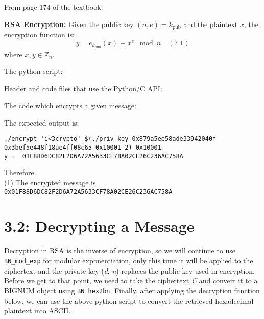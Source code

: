 \documentclass[a4paper,11pt]{article}
\theoremstyle{mytheor}
\begin{document}
\noindent From page 174 of the textbook:
\begin{tcolorbox}[colback=white,colframe=black,sharp corners, boxrule=0.5pt]
\textbf{RSA Encryption:} Given the public key \((n,e) = k_{\text{pub}}\) and the plaintext \(x\), the encryption function is:
\[ y = e_{k_{\text{pub}}}(x) \equiv x^e \mod n \quad (7.1) \]
where \(x, y \in \mathbb{Z}_n\).
\end{tcolorbox}
\vspace{4mm} %
\noindent The python script:


\vspace{4mm} %
\noindent Header and code files that use the Python/C API:

\vspace{4mm} %


\vspace{4mm}
\noindent The code which encrypts a given message:
\vspace{4mm} %


\vspace{4mm}
\noindent The expected output is:

\begin{verbatim}
./encrypt 'i<3crypto' $(./priv_key 0x879a5ee58ade33942040f  
0x3bef5e448f18ae4ff08c65 0x10001 2) 0x10001
y =  01F88D6DC82F2D6A72A5633CF78A02CE26C236AC758A
\end{verbatim}

\noindent Therefore \\
(1) The encrypted message is \texttt{0x01F88D6DC82F2D6A72A5633CF78A02CE26C236AC758A}

\vspace{-2mm}
\section*{\large 3.2: Decrypting a Message}

Decryption in RSA is the inverse of encryption, so we will continue to use \texttt{BN\_mod\_exp} for modular exponentiation, only this time it will be applied to the ciphertext and the private key (\textit{d}, \textit{n}) replaces the public key used in encryption. Before we get to that point, we need to take the ciphertext \textit{C} and convert it to a BIGNUM object using \texttt{BN\_hex2bn}. Finally, after applying the decryption function below, we can use the above python script to convert the retrieved hexadecimal plaintext into ASCII. \\
\end{document}

